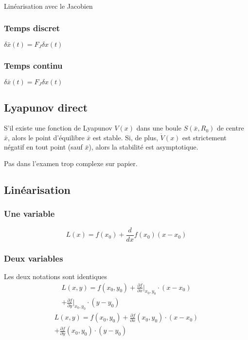 \documentclass[resume]{subfiles}
\begin{document}
 Linéarisation avec le Jacobien

\subsubsection{Temps discret}

$\delta \bar{x}(t) = F_J \delta x(t)$ 

\subsubsection{Temps continu}

$\delta\bar{x}(t) = F_J\delta x(t)$ 

\subsection{Lyapunov direct}

S'il existe une fonction de Lyapunov $V(x)$ dans une boule $S(\bar{x},R_0)$ de centre $\bar{x}$, alors le point d'équilibre $\bar{x}$ est stable. Si, de plus, $\dot{V}(x)$ est strictement négatif en tout point (sauf $\bar{x}$), alors la stabilité est asymptotique.  

Pas dans l'examen trop complexe sur papier.

\subsection{Linéarisation}
\subsubsection{Une variable}
$$\boxed{L(x)=f(x_0)+\frac{d}{dx}f(x_0)(x-x_0)}$$
\subsubsection{Deux variables}
Les deux notations sont identiques
\begin{multline*}
L(x,y)=f(x_0,y_0)+\frac{\partial f}{\partial x}\Big|_{x_0,y_0}\cdot(x-x_0) \\+ \frac{\partial f}{\partial y}\Big|_{x_0,y_0}\cdot(y-y_0)
\end{multline*}
\begin{multline*}
L(x,y)=f(x_0,y_0)+\frac{\partial f}{\partial x}(x_0,y_0)\cdot(x-x_0) \\+ \frac{\partial f}{\partial y}(x_0,y_0)\cdot(y-y_0)
\end{multline*}
\end{document}
